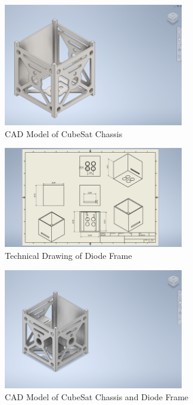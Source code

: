         \begin{figure}[htbp]
            \centering
            \includegraphics[width=0.7\textwidth]{figures/Appendix-CAD/CubeCAD1.png}
            \caption*{CAD Model of CubeSat Chassis} 
            \label{fig:CubeCAD1}
            \end{figure}
        
            \begin{figure}[htbp]
                \centering
                \includegraphics[width=0.7\textwidth]{figures/Appendix-CAD/CubeDiodeDRAW1.png}
                \caption*{Technical Drawing of Diode Frame} 
                \label{fig:CubeDiodeDRAW1}
                \end{figure}

                \begin{figure}[htbp]
                    \centering
                    \includegraphics[width=0.7\textwidth]{figures/Appendix-CAD/combinedCAD1.png}
                    \caption*{CAD Model of CubeSat Chassis and Diode Frame} 
                    \label{fig:CubeCombine1}
                    \end{figure}

